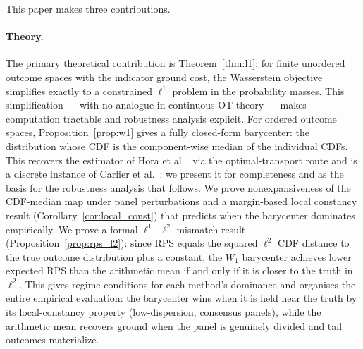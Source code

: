This paper makes three contributions.

\paragraph{Theory.}  The primary theoretical contribution is Theorem~\ref{thm:l1}: for finite unordered outcome spaces with the indicator ground cost, the Wasserstein objective simplifies exactly to a constrained $\ell^1$ problem in the probability masses.  This simplification --- with no analogue in continuous OT theory --- makes computation tractable and robustness analysis explicit.  For ordered outcome spaces, Proposition~\ref{prop:w1} gives a fully closed-form barycenter: the distribution whose CDF is the component-wise median of the individual CDFs.  This recovers the estimator of Hora et al.\ \cite{hora13} via the optimal-transport route and is a discrete instance of Carlier et al.\ \cite{carlier23}; we present it for completeness and as the basis for the robustness analysis that follows.  We prove nonexpansiveness of the CDF-median map under panel perturbations and a margin-based local constancy result (Corollary~\ref{cor:local_const}) that predicts when the barycenter dominates empirically.  We prove a formal $\ell^1$--$\ell^2$ mismatch result (Proposition~\ref{prop:rps_l2}): since RPS equals the squared $\ell^2$ CDF distance to the true outcome distribution plus a constant, the $W_1$ barycenter achieves lower expected RPS than the arithmetic mean if and only if it is closer to the truth in $\ell^2$.  This gives regime conditions for each method's dominance and organises the entire empirical evaluation: the barycenter wins when it is held near the truth by its local-constancy property (low-dispersion, consensus panels), while the arithmetic mean recovers ground when the panel is genuinely divided and tail outcomes materialize.

